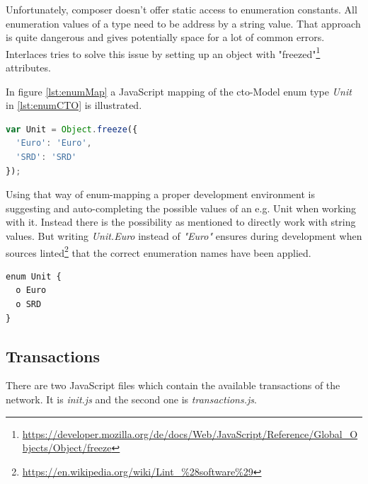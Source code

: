 Unfortunately, composer doesn't offer static access to enumeration constants. All enumeration values of a type need to be address by a string value. That approach is quite dangerous and gives potentially space for a lot of common errors. Interlaces tries to solve this issue by setting up an object with "freezed"\footnote{\url{https://developer.mozilla.org/de/docs/Web/JavaScript/Reference/Global_Objects/Object/freeze}} attributes.

In figure \ref{lst:enumMap} a JavaScript mapping of the cto-Model enum type \textit{Unit} in \ref{lst:enumCTO} is illustrated.

\begin{center}
\begin{minipage}{0.8\textwidth}
\small
\begin{lstlisting}[language=javascript,firstnumber=1,caption={\bf\small JavaScript enumeration mapping}, captionpos=b,label=lst:enumMap]
var Unit = Object.freeze({
  'Euro': 'Euro',
  'SRD': 'SRD'
});
\end{lstlisting}
\end{minipage}
\end{center}

Using that way of enum-mapping a proper development environment is suggesting and auto-completing the possible values of an e.g. Unit when working with it. Instead there is the possibility as mentioned to directly work with string values. But writing \textit{Unit.Euro} instead of \textit{"Euro"} ensures during development when sources linted\footnote{\url{https://en.wikipedia.org/wiki/Lint_\%28software\%29}} that the correct enumeration names have been applied.

\begin{center}
\begin{minipage}{0.8\textwidth}
\small
\begin{lstlisting}[language=cto,firstnumber=1,caption={\bf\small enum in CTO-model}, captionpos=b,label=lst:enumCTO]
enum Unit {
  o Euro
  o SRD
}
\end{lstlisting}
\end{minipage}
\end{center}

\subsection{Transactions}
\label{sec:transactions}

There are two JavaScript files which contain the available transactions of the network. It is \textit{init.js} and the second one is \textit{transactions.js}.

